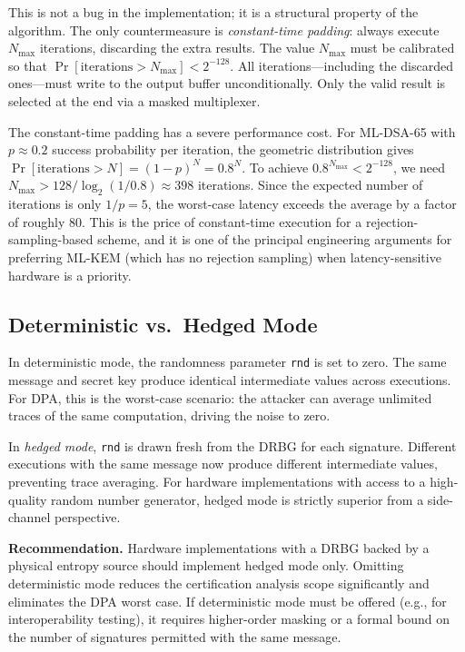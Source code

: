 This is not a bug in the implementation; it is a structural property of the algorithm.  The only countermeasure is \emph{constant-time padding}: always execute $N_{\max}$ iterations, discarding the extra results.  The value $N_{\max}$ must be calibrated so that $\Pr[\text{iterations} > N_{\max}] < 2^{-128}$.  All iterations---including the discarded ones---must write to the output buffer unconditionally.  Only the valid result is selected at the end via a masked multiplexer.

The constant-time padding has a severe performance cost.  For ML-DSA-65 with $p \approx 0.2$ success probability per iteration, the geometric distribution gives $\Pr[\text{iterations} > N] = (1-p)^N = 0.8^N$.  To achieve $0.8^{N_{\max}} < 2^{-128}$, we need $N_{\max} > 128 / \log_2(1/0.8) \approx 398$ iterations.  Since the expected number of iterations is only $1/p = 5$, the worst-case latency exceeds the average by a factor of roughly 80.  This is the price of constant-time execution for a rejection-sampling-based scheme, and it is one of the principal engineering arguments for preferring ML-KEM (which has no rejection sampling) when latency-sensitive hardware is a priority.

\subsection{Deterministic vs.\ Hedged Mode}
\label{subsec:det-vs-hedged}

In deterministic mode, the randomness parameter \texttt{rnd} is set to zero.  The same message and secret key produce identical intermediate values across executions.  For DPA, this is the worst-case scenario: the attacker can average unlimited traces of the same computation, driving the noise to zero.

In \emph{hedged mode}, \texttt{rnd} is drawn fresh from the DRBG for each signature.  Different executions with the same message now produce different intermediate values, preventing trace averaging.  For hardware implementations with access to a high-quality random number generator, hedged mode is strictly superior from a side-channel perspective.

\begin{svgraybox}
\textbf{Recommendation.}  Hardware implementations with a DRBG backed by a physical entropy source should implement hedged mode only.  Omitting deterministic mode reduces the certification analysis scope significantly and eliminates the DPA worst case.  If deterministic mode must be offered (e.g., for interoperability testing), it requires higher-order masking or a formal bound on the number of signatures permitted with the same message.
\end{svgraybox}


